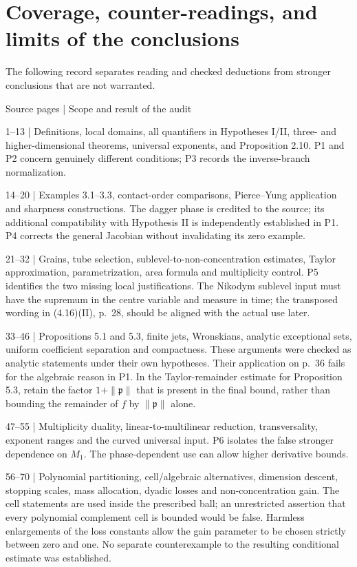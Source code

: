 \documentclass[10pt]{article}
\begin{document}
\section*{Coverage, counter-readings, and limits of the conclusions}
The following record separates reading and checked deductions from stronger conclusions that are not warranted.\par
Source pages | Scope and result of the audit\par
1–13 | Definitions, local domains, all quantifiers in Hypotheses I/II, three- and higher-dimensional theorems, universal exponents, and Proposition 2.10. P1 and P2 concern genuinely different conditions; P3 records the inverse-branch normalization.\par
14–20 | Examples 3.1–3.3, contact-order comparisons, Pierce–Yung application and sharpness constructions. The dagger phase is credited to the source; its additional compatibility with Hypothesis II is independently established in P1. P4 corrects the general Jacobian without invalidating its zero example.\par
21–32 | Grains, tube selection, sublevel-to-non-concentration estimates, Taylor approximation, parametrization, area formula and multiplicity control. P5 identifies the two missing local justifications. The Nikodym sublevel input must have the supremum in the centre variable and measure in time; the transposed wording in (4.16)(II), p. 28, should be aligned with the actual use later.\par
33–46 | Propositions 5.1 and 5.3, finite jets, Wronskians, analytic exceptional sets, uniform coefficient separation and compactness. These arguments were checked as analytic statements under their own hypotheses. Their application on p. 36 fails for the algebraic reason in P1. In the Taylor-remainder estimate for Proposition 5.3, retain the factor \(1+\|\mathfrak p\|\) that is present in the final bound, rather than bounding the remainder of \(f\) by \(\|\mathfrak p\|\) alone.\par
47–55 | Multiplicity duality, linear-to-multilinear reduction, transversality, exponent ranges and the curved universal input. P6 isolates the false stronger dependence on \(M_1\). The phase-dependent use can allow higher derivative bounds.\par
56–70 | Polynomial partitioning, cell/algebraic alternatives, dimension descent, stopping scales, mass allocation, dyadic losses and non-concentration gain. The cell statements are used inside the prescribed ball; an unrestricted assertion that every polynomial complement cell is bounded would be false. Harmless enlargements of the loss constants allow the gain parameter to be chosen strictly between zero and one. No separate counterexample to the resulting conditional estimate was established.\par
\end{document}
